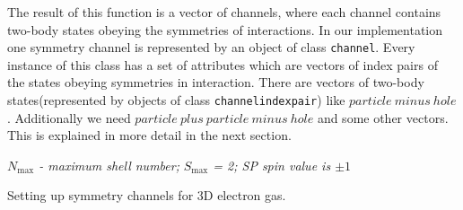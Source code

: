 \documentclass[twoside,english]{uiofysmaster}
\newcommand{\classname}[1]{\texttt{#1}}
\begin{document}
The result of this function is a vector of channels, where each channel contains two-body states obeying the symmetries of interactions.
In our implementation one symmetry channel is represented by an object of class \classname{channel}. Every instance of this class has a set of attributes which are vectors of index pairs of the states obeying symmetries in interaction.  
There are vectors of two-body states(represented by objects of class \classname{channelindexpair}) like ${particle\ minus\ hole}$. Additionally we need ${particle\ plus\ particle\ minus\ hole}$ and some other vectors. This is explained in more detail in the next section. 
\IncMargin{1em}
\begin{algorithm}[h!]
	\SetAlgoLined
	
	\BlankLine
	\emph{$N_{\mathrm{max}}$ - maximum shell number;}\;
	\emph{$S_{\mathrm{max}}$ = 2; SP spin value is $\pm 1$}\;
	\For{$N_x\leftarrow -N_{\mathrm{max}}$ \KwTo $N_{\mathrm{max}}$}{
		\For{$N_y\leftarrow -N_{\mathrm{max}}$ \KwTo $N_{\mathrm{max}}$}{  %
			\For{$N_z\leftarrow -N_{\mathrm{max}}$ \KwTo $N_{\mathrm{max}}$}{
				\For{$S\leftarrow -S_{\mathrm{max}}$ \KwTo $S_{\mathrm{max}}$}{
					Create channel\\

						\For{$i\leftarrow 1$ \KwTo $N_{\mathrm{Fermi}}$}{
							\For{$j\leftarrow 1$ \KwTo $N_{\mathrm{Fermi}}$}{
								
								\If{$N_x,N_y,N_z,S$ $\mathrm{of\ state}$ $(i+j)$ = $N_x,N_y,N_z,S$}
								{add i,j to HoleHole vector}
						}
					}
					add HoleHole vector to Channel\\
						\For{$i\leftarrow 1$ \KwTo $N_{\mathrm{Fermi}}$}{
							\For{$a\leftarrow N_{\mathrm{Fermi}}$ \KwTo $N_{\mathrm{States}}$}{
								
								\If{$N_x,N_y,N_z,S$ $\mathrm{of\ state}$ $(i+a)$ = $N_x,N_y,N_z,S$}
								{add i,a to ParticleHole vector}
							}
						}					
					add ParticleHole vector to Channel\\
					$\dots$\\
					add ParticleParticle vector to Channel\\
					add HoleParticle vector to Channel\\
					add ParticleMinusHole vector to Channel\\
					add HoleMinusParticle vector to Channel\\


				}
			}
		}
	}
	\caption{Setting up symmetry channels for 3D electron gas.}\label{CCSetUpChannels}
\end{algorithm}\DecMargin{1em}
\end{document}
